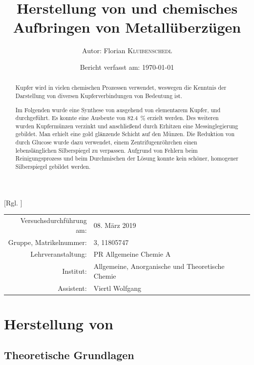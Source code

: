 \documentclass{article}
\title{Herstellung von \ch{CuSO4 * 5 H2O} und chemisches Aufbringen von Metallüberzügen \cite{Versuchsvorschrift}} %
\author{Autor: Florian \textsc{Kluibenschedl}} %
\date{Bericht verfasst am: \today} %
\begin{document}
  [Rgl. ]{}{}
  
  \maketitle %
  
  \begin{center}
    \begin{tabular}{r p{4cm}}
      Versuchsdurchführung am: & 08. März 2019\\ %
      Gruppe, Matrikelnummer: & 3, 11805747 \\
      Lehrveranstaltung: & PR Allgemeine Chemie A \\
      Institut: & Allgemeine, Anorganische und Theoretische Chemie \\
      Assistent: & Viertl Wolfgang %
    \end{tabular}
  \end{center}


  \begin{abstract}
    Kupfer wird in vielen chemischen Prozessen verwendet, weswegen die Kenntnis der Darstellung von diversen Kupferverbindungen von Bedeutung ist. 
    
    Im Folgenden wurde eine Synthese von  ausgehend von elementarem Kupfer,  und  durchgeführt. Es konnte eine Ausbeute von \SI[mode=text]{82.4}{\percent} erzielt werden. Des weiteren wurden Kupfermünzen verzinkt und anschließend durch Erhitzen eine Messinglegierung gebildet. Man erhielt eine gold glänzende Schicht auf den Münzen. Die Reduktion von  durch Glucose wurde dazu verwendet, einem Zentrifugenröhrchen einen lebenslänglichen Silberspiegel zu verpassen. Aufgrund von Fehlern beim Reinigungsprozess und beim Durchmischen der Lösung konnte kein schöner, homogener Silberspiegel gebildet werden.
  \end{abstract}
  
  \pagebreak
  
  \section{Herstellung von }
  
    \subsection{Theoretische Grundlagen}
  
\end{document}
